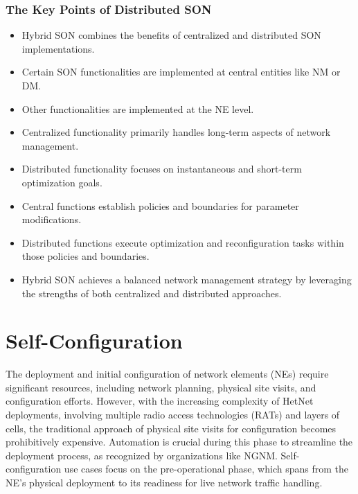 \subsubsection{The Key Points of Distributed SON}
\begin{itemize}

\item Hybrid SON combines the benefits of centralized and distributed SON implementations.

\item Certain SON functionalities are implemented at central entities like NM or DM.

\item Other functionalities are implemented at the NE level.

\item Centralized functionality primarily handles long-term aspects of network management.

\item Distributed functionality focuses on instantaneous and short-term optimization goals.

\item Central functions establish policies and boundaries for parameter modifications.

\item Distributed functions execute optimization and reconfiguration tasks within those policies and boundaries.

\item Hybrid SON achieves a balanced network management strategy by leveraging the strengths of both centralized and distributed approaches.

\end{itemize}


\section{Self-Configuration}

The deployment and initial configuration of network elements (NEs) require significant resources, including network planning, physical site visits, and configuration efforts. However, with the increasing complexity of HetNet deployments, involving multiple radio access technologies (RATs) and layers of cells, the traditional approach of physical site visits for configuration becomes prohibitively expensive. Automation is crucial during this phase to streamline the deployment process, as recognized by organizations like NGNM. Self-configuration use cases focus on the pre-operational phase, which spans from the NE's physical deployment to its readiness for live network traffic handling. 

